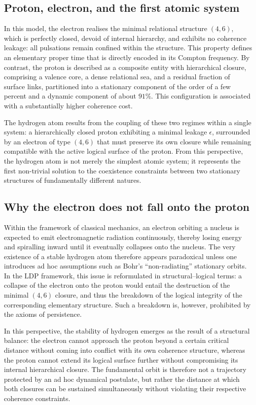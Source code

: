 \documentclass[11pt,a4paper]{article}
\begin{document}
\subsection{Proton, electron, and the first atomic system}
In this model, the electron realises the minimal relational structure \((4,6)\), which is perfectly closed, devoid of internal hierarchy, and exhibits no coherence leakage: all pulsations remain confined within the structure. This property defines an elementary proper time that is directly encoded in its Compton frequency. By contrast, the proton is described as a composite entity with hierarchical closure, comprising a valence core, a dense relational sea, and a residual fraction of surface links, partitioned into a stationary component of the order of a few percent and a dynamic component of about \(91\%\). This configuration is associated with a substantially higher coherence cost.

The hydrogen atom results from the coupling of these two regimes within a single system: a hierarchically closed proton exhibiting a minimal leakage \(\epsilon\), surrounded by an electron of type \((4,6)\) that must preserve its own closure while remaining compatible with the active logical surface of the proton. From this perspective, the hydrogen atom is not merely the simplest atomic system; it represents the first non-trivial solution to the coexistence constraints between two stationary structures of fundamentally different natures.

\subsection{Why the electron does not fall onto the proton}

Within the framework of classical mechanics, an electron orbiting a nucleus is expected to emit electromagnetic radiation continuously, thereby losing energy and spiralling inward until it eventually collapses onto the nucleus. The very existence of a stable hydrogen atom therefore appears paradoxical unless one introduces ad hoc assumptions such as Bohr’s “non‑radiating” stationary orbits. In the LDP framework, this issue is reformulated in structural–logical terms: a collapse of the electron onto the proton would entail the destruction of the minimal \((4,6)\) closure, and thus the breakdown of the logical integrity of the corresponding elementary structure. Such a breakdown is, however, prohibited by the axioms of persistence.

In this perspective, the stability of hydrogen emerges as the result of a structural balance: the electron cannot approach the proton beyond a certain critical distance without coming into conflict with its own coherence structure, whereas the proton cannot extend its logical surface further without compromising its internal hierarchical closure. The fundamental orbit is therefore not a trajectory protected by an ad hoc dynamical postulate, but rather the distance at which both closures can be sustained simultaneously without violating their respective coherence constraints. 
\end{document}
